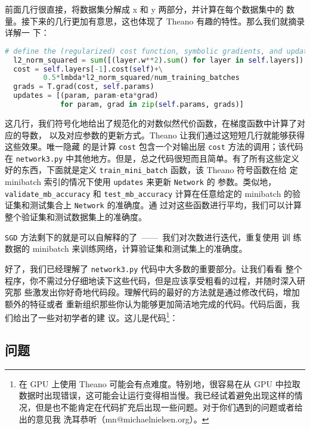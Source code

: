 前面几行很直接，将数据集分解成 x 和 y 两部分，并计算在每个数据集中\minibatch{}的
数量。接下来的几行更加有意思，这也体现了 Theano 有趣的特性。那么我们就摘录详解一
下：

\begin{lstlisting}[language=Python]
  # define the (regularized) cost function, symbolic gradients, and updates
  l2_norm_squared = sum([(layer.w**2).sum() for layer in self.layers])
  cost = self.layers[-1].cost(self)+\
         0.5*lmbda*l2_norm_squared/num_training_batches
  grads = T.grad(cost, self.params)
  updates = [(param, param-eta*grad) 
             for param, grad in zip(self.params, grads)]
\end{lstlisting}

这几行，我们符号化地给出了规范化的对数似然代价函数，在梯度函数中计算了对应的导数，
以及对应参数的更新方式。Theano 让我们通过这短短几行就能够获得这些效果。唯一隐藏
的是计算 \lstinline!cost! 包含一个对输出层 \lstinline!cost! 方法的调用；该代码在
\lstinline!network3.py! 中其他地方。但是，总之代码很短而且简单。有了所有这些定义
好的东西，下面就是定义 \lstinline!train_mini_batch! 函数，该 Theano 符号函数在给
定 minibatch 索引的情况下使用 \lstinline!updates! 来更新 \lstinline!Network! 的
参数。类似地，\lstinline!validate_mb_accuracy! 和 \lstinline!test_mb_accuracy!
计算在任意给定的 minibatch 的验证集和测试集合上 \lstinline!Network! 的准确度。通
过对这些函数进行平均，我们可以计算整个验证集和测试数据集上的准确度。

\lstinline!SGD! 方法剩下的就是可以自解释的了~——~我们对次数进行迭代，重复使用 训
练数据的 minibatch 来训练网络，计算验证集和测试集上的准确度。

好了，我们已经理解了 \lstinline!network3.py! 代码中大多数的重要部分。让我们看看
整个程序，你不需过分仔细地读下这些代码，但是应该享受粗看的过程，并随时深入研究那
些激发出你好奇地代码段。理解代码的最好的方法就是通过修改代码，增加额外的特征或者
重新组织那些你认为能够更加简洁地完成的代码。代码后面，我们给出了一些对初学者的建
议。这儿是代码\footnote{在 GPU 上使用 Theano 可能会有点难度。特别地，很容易在从
  GPU 中拉取数据时出现错误，这可能会让运行变得相当慢。我已经试着避免出现这样的情
  况，但是也不能肯定在代码扩充后出现一些问题。对于你们遇到的问题或者给出的意见我
  洗耳恭听（mn@michaelnielsen.org）。}：



\subsection*{问题}

